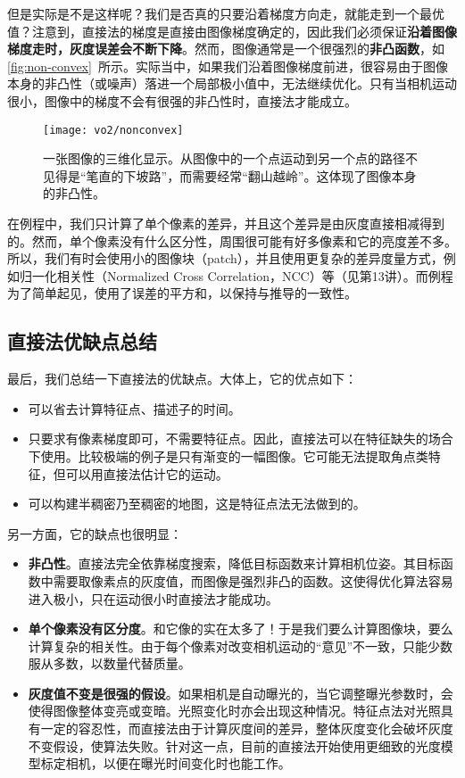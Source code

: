 但是实际是不是这样呢？我们是否真的只要沿着梯度方向走，就能走到一个最优值？注意到，直接法的梯度是直接由图像梯度确定的，因此我们必须保证\textbf{沿着图像梯度走时，灰度误差会不断下降}。然而，图像通常是一个很强烈的\textbf{非凸函数}，如\autoref{fig:non-convex}~所示。实际当中，如果我们沿着图像梯度前进，很容易由于图像本身的非凸性（或噪声）落进一个局部极小值中，无法继续优化。只有当相机运动很小，图像中的梯度不会有很强的非凸性时，直接法才能成立。

\begin{figure}[!htp]
	\centering
	\texttt{[image: vo2/nonconvex]}
	\caption{一张图像的三维化显示。从图像中的一个点运动到另一个点的路径不见得是“笔直的下坡路”，而需要经常“翻山越岭”。这体现了图像本身的非凸性。}
	\label{fig:non-convex}
\end{figure}

在例程中，我们只计算了单个像素的差异，并且这个差异是由灰度直接相减得到的。然而，单个像素没有什么区分性，周围很可能有好多像素和它的亮度差不多。所以，我们有时会使用小的图像块（patch），并且使用更复杂的差异度量方式，例如归一化相关性（Normalized Cross Correlation，NCC）等（见第13讲）。而例程为了简单起见，使用了误差的平方和，以保持与推导的一致性。

\subsection{直接法优缺点总结}
最后，我们总结一下直接法的优缺点。大体上，它的优点如下：

\begin{itemize}
	\item 可以省去计算特征点、描述子的时间。
	\item 只要求有像素梯度即可，不需要特征点。因此，直接法可以在特征缺失的场合下使用。比较极端的例子是只有渐变的一幅图像。它可能无法提取角点类特征，但可以用直接法估计它的运动。
	\item 可以构建半稠密乃至稠密的地图，这是特征点法无法做到的。
\end{itemize}

另一方面，它的缺点也很明显：
\begin{itemize}
	\item \textbf{非凸性}。直接法完全依靠梯度搜索，降低目标函数来计算相机位姿。其目标函数中需要取像素点的灰度值，而图像是强烈非凸的函数。这使得优化算法容易进入极小，只在运动很小时直接法才能成功。
	\item \textbf{单个像素没有区分度}。和它像的实在太多了！于是我们要么计算图像块，要么计算复杂的相关性。由于每个像素对改变相机运动的“意见”不一致，只能少数服从多数，以数量代替质量。
	\item \textbf{灰度值不变是很强的假设}。如果相机是自动曝光的，当它调整曝光参数时，会使得图像整体变亮或变暗。光照变化时亦会出现这种情况。特征点法对光照具有一定的容忍性，而直接法由于计算灰度间的差异，整体灰度变化会破坏灰度不变假设，使算法失败。针对这一点，目前的直接法开始使用更细致的光度模型标定相机，以便在曝光时间变化时也能工作。
\end{itemize}

